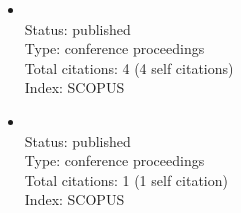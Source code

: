 \begin{refsection}
\begin{itemize}
		\item{}\vspace{2mm}\\Status: published\\Type: conference proceedings\\Total citations: 4 (4 self citations)\\Index: SCOPUS
		\item{}\vspace{2mm}\\Status: published\\Type: conference proceedings\\Total citations: 1 (1 self citation)\\Index: SCOPUS
\end{itemize}
\end{refsection}

